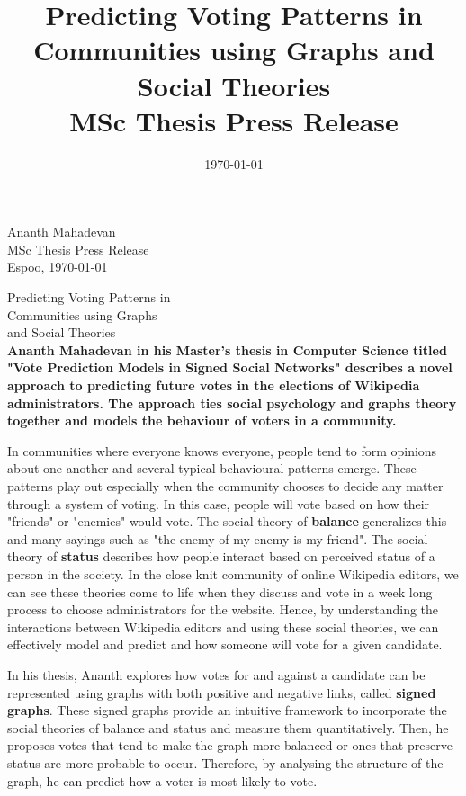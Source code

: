\documentclass[12pt,a4paper]{article}
\title{\color{astral}\myfont Predicting Voting Patterns in Communities using  Graphs and Social Theories\\
  \Large MSc Thesis Press Release}
\date{\today}
\author{\AUTHOR}
\newcommand{\AUTHOR}{Ananth Mahadevan}
\newcommand{\TTITLE}{Vote Prediction Models in Signed Social Networks}
\begin{document}
{\raggedleft \AUTHOR\\
\vskip 2mm
\noindent
MSc Thesis Press Release\\
\vskip 2mm
\noindent Espoo, \today
\vskip 10mm
}

{\centering \color{astral}\myfont Predicting Voting Patterns in \\Communities using  Graphs \\and Social Theories\\
}
\vskip 4mm
\noindent
{\bf
\large
Ananth Mahadevan in his Master's thesis in Computer Science titled "\TTITLE" describes a novel approach to predicting future votes in the elections of Wikipedia administrators. The approach ties social psychology and graphs theory together and models the behaviour of voters in a community.
}

\medskip
\noindent
In communities where everyone knows everyone, people tend to form opinions about one another and several typical behavioural patterns emerge.
These patterns play out especially when the community chooses to decide any matter through a system of voting.
In this case, people will vote based on how their "friends" or "enemies" would vote.
The social theory of \textbf{balance} generalizes this and many sayings such as "the enemy of my enemy is my friend".
The social theory of \textbf{status} describes how people interact based on perceived status of a person in the society.
In the close knit community of online Wikipedia editors, we can see these theories come to life when they discuss and vote in a week long process to choose administrators for the website.
Hence, by understanding the interactions between Wikipedia editors and using these social theories, we can effectively model and predict and how someone will vote for a given candidate.

\medskip
\noindent
In his thesis, Ananth explores how votes for and against a candidate can be represented using graphs with both positive and negative links, called \textbf{signed graphs}.
These signed graphs provide an intuitive framework to incorporate the social theories of balance and status and measure them quantitatively.
Then, he proposes votes that tend to make the graph more balanced or ones that preserve status are more probable to occur.
Therefore, by analysing the structure of the graph, he can predict how a voter is most likely to vote. 
\end{document}
